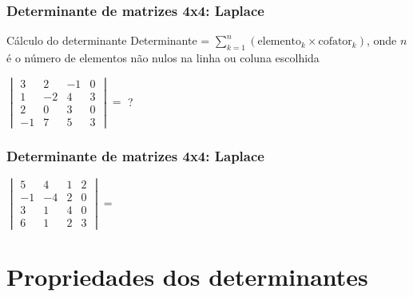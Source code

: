 \documentclass[pdftex, brazil, aspectratio=169]{beamer}
\begin{document}
\begin{frame}[t]
  \frametitle{Determinante de matrizes 4x4: Laplace}
  \begin{block}{Cálculo do determinante}
    Determinante = $\displaystyle \sum_{k=1}^n (\text{elemento}_k \times \text{cofator}_k)$,
        onde $n$ é o número de elementos não nulos na linha ou coluna escolhida
  \end{block}
  $\begin{vmatrix}
    3 & 2 & -1 & 0\\
    1 & -2 & 4 & 3\\
    2 & 0 & 3 & 0\\
    -1 & 7 & 5 & 3\end{vmatrix} =$ ?
\end{frame}

\begin{frame}[t]
  \frametitle{Determinante de matrizes 4x4: Laplace}
  $\begin{vmatrix}
    5 & 4 & 1 & 2\\
    -1 & -4 & 2 & 0\\
    3 & 1 & 4 & 0\\
    6 & 1 & 2 & 3\end{vmatrix} =$
\end{frame}


\section{Propriedades dos determinantes}
\end{document}
